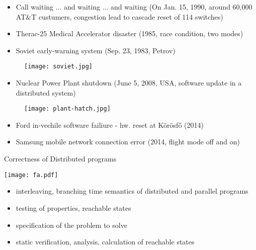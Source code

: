 \documentclass[compress]{beamer}
\begin{document}
\begin{frame}{}
\begin{itemize}

\item Call waiting ... and waiting ... and waiting (On Jan. 15, 1990, around 60,000 AT\&T custumers, congestion lead to cascade reset of 114 switches)

\item Therac-25 Medical Accelerator disaster (1985, race condition, two modes)

\item Soviet early-warning system (Sep. 23, 1983, Petrov)

\end{itemize}
\begin{figure}
\texttt{[image: soviet.jpg]}
\end{figure}
\end{frame}


\begin{frame}{}
\begin{itemize}

\item Nuclear Power Plant shutdown (June 5, 2008, USA, software update in a distributed system)

\end{itemize}

\begin{figure}
\texttt{[image: plant-hatch.jpg]}
\end{figure}

\begin{itemize}

\item Ford in-vechile software failiure - hw. reset at Körösf\H o (2014)

\item Samsung mobile network connection error (2014, flight mode off and on) 

\end{itemize}

\end{frame}

\begin{frame}{Correctness of Distributed programs}

\texttt{[image: fa.pdf]}

\begin{itemize}

\item interleaving, branching time semantics of distributed and parallel programs

\item testing of properties, reachable states

\item specification of the problem to solve

\item static verification, analysis, calculation of reachable states

\end{itemize}

\end{frame}
\end{document}
